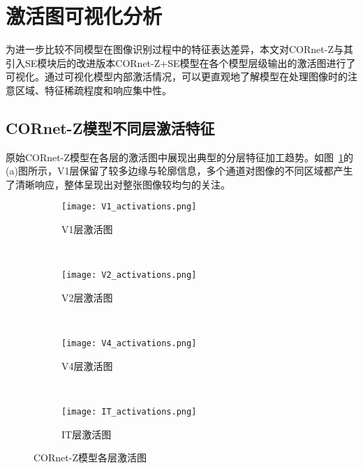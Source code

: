 \section{激活图可视化分析}

为进一步比较不同模型在图像识别过程中的特征表达差异，本文对CORnet-Z与其引入SE模块后的改进版本CORnet-Z+SE模型在各个模型层级输出的激活图进行了可视化。通过可视化模型内部激活情况，可以更直观地了解模型在处理图像时的注意区域、特征稀疏程度和响应集中性。

\subsection{CORnet-Z模型不同层激活特征}

原始CORnet-Z模型在各层的激活图中展现出典型的分层特征加工趋势。如图~\ref{f.cornet_z_jihuo}的(a)图所示，V1层保留了较多边缘与轮廓信息，多个通道对图像的不同区域都产生了清晰响应，整体呈现出对整张图像较均匀的关注。

\begin{figure}[!htb]
	\centering
	\begin{subfigure}[t]{0.8\linewidth}
		\captionsetup{justification=centering}
		\begin{minipage}[b]{1\linewidth}
			\texttt{[image: V1\_activations.png]}
			\caption{V1层激活图}
		\end{minipage}
	\end{subfigure}\\
	\begin{subfigure}[t]{0.8\linewidth}
		\captionsetup{justification=centering}
		\begin{minipage}[b]{1\linewidth}
			\texttt{[image: V2\_activations.png]}
			\caption{V2层激活图}
		\end{minipage}
	\end{subfigure}\\
	\begin{subfigure}[t]{0.8\linewidth}
		\captionsetup{justification=centering}
		\begin{minipage}[b]{1\linewidth}
			\texttt{[image: V4\_activations.png]}
			\caption{V4层激活图}
		\end{minipage}
	\end{subfigure}\\
	\begin{subfigure}[t]{0.8\linewidth}
		\captionsetup{justification=centering}
		\begin{minipage}[b]{1\linewidth}
			\texttt{[image: IT\_activations.png]}
			\caption{IT层激活图}
		\end{minipage}
	\end{subfigure}
	\caption{CORnet-Z模型各层激活图}
	\label{f.cornet_z_jihuo}
\end{figure}

